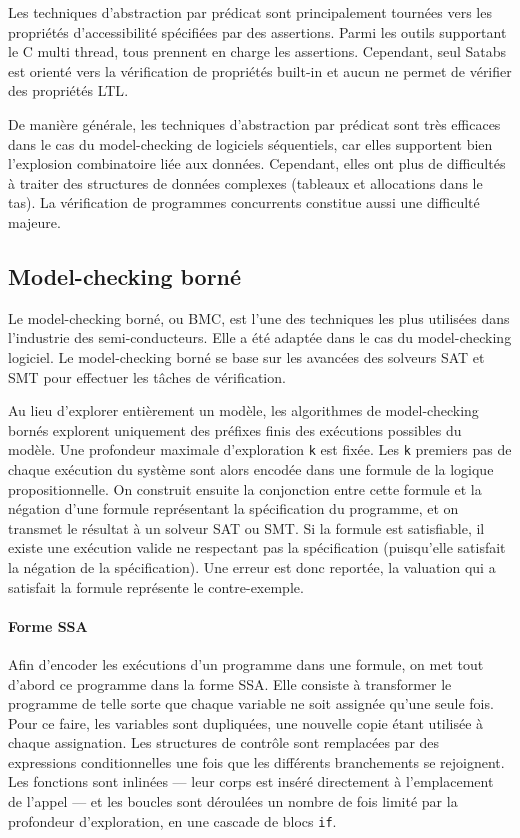 Les techniques d'abstraction par prédicat sont principalement tournées vers les
propriétés d'accessibilité spécifiées par des assertions. Parmi les outils
supportant le C multi thread, tous prennent en charge les assertions. Cependant, seul
Satabs est orienté vers la vérification de propriétés built-in et aucun ne
permet de vérifier des propriétés \ac{LTL}.

De manière générale, les techniques d'abstraction par prédicat sont très
efficaces dans le cas du model-checking de logiciels séquentiels, car elles
supportent bien l'explosion combinatoire liée aux données. Cependant, elles ont
plus de difficultés à traiter des structures de données complexes (tableaux et
allocations dans le tas). La vérification de programmes concurrents constitue
aussi une difficulté majeure.

\subsection{Model-checking borné}

Le model-checking borné, ou \ac{BMC}, est l'une des
techniques les plus utilisées dans l'industrie des semi-conducteurs. Elle a été
adaptée dans le cas du model-checking logiciel. Le model-checking borné se base
sur les avancées des solveurs SAT et SMT pour effectuer les tâches de
vérification.

Au lieu d'explorer entièrement un modèle, les algorithmes de model-checking
bornés explorent uniquement des préfixes finis des exécutions possibles du
modèle. Une profondeur maximale d'exploration \texttt{k} est fixée.
Les \texttt{k} premiers pas de chaque exécution du système sont alors
encodée dans une formule de la logique propositionnelle.
On construit ensuite la conjonction entre cette formule et la négation d'une
formule représentant la spécification du programme, et on transmet le résultat
à un solveur SAT ou SMT. Si la formule est satisfiable, il existe une
exécution valide ne respectant pas la spécification (puisqu’elle satisfait la
négation de la spécification). Une erreur est donc reportée, la valuation qui a
satisfait la formule représente le contre-exemple.

\paragraph{Forme SSA}
Afin d'encoder les exécutions d'un programme dans une
formule, on met tout d'abord ce programme dans la forme \ac{SSA}.
Elle consiste à transformer le programme de telle sorte que chaque
variable ne soit assignée qu'une seule fois. Pour ce faire, les variables sont
dupliquées, une nouvelle copie étant utilisée à chaque assignation. Les
structures de contrôle sont remplacées par des expressions conditionnelles une
fois que les différents branchements se rejoignent. Les fonctions sont inlinées
--- leur corps est inséré directement à l'emplacement de l'appel --- et les
boucles sont déroulées un nombre de fois limité par la profondeur d'exploration,
en une cascade de blocs \texttt{if}.

